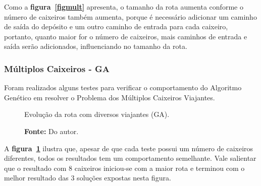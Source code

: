 \documentclass[12pt,openright,a4paper,twoside]{tcc}
\begin{document}
        Como a \textbf{figura~\ref{figmult}} apresenta, o tamanho da rota aumenta conforme o número de caixeiros também aumenta, porque é necessário adicionar um caminho de saída do depósito e um outro caminho de entrada para cada caixeiro, portanto, quanto maior for o número de caixeiros, mais caminhos de entrada e saída serão adicionados, influenciando no tamanho da rota.

        \newpage
		\subsubsection{Múltiplos Caixeiros - GA}

		Foram realizados alguns testes para verificar o comportamento do Algoritmo Genético em resolver o Problema dos Múltiplos Caixeiros Viajantes.

		\begin{figure}[h]
			\centering
            \caption{Evolução da rota com diversos viajantes (GA).}
			\caption*{\textbf{Fonte:} Do autor.}
			\label{figgaga}
		\end{figure}

		A \textbf{figura~\ref{figgaga}} ilustra que, apesar de que cada teste possui um número de caixeiros diferentes, todos os resultados tem um comportamento semelhante. Vale salientar que o resultado com 8 caixeiros iniciou-se com a maior rota e terminou com o melhor resultado das 3 soluções expostas nesta figura.
\end{document}
